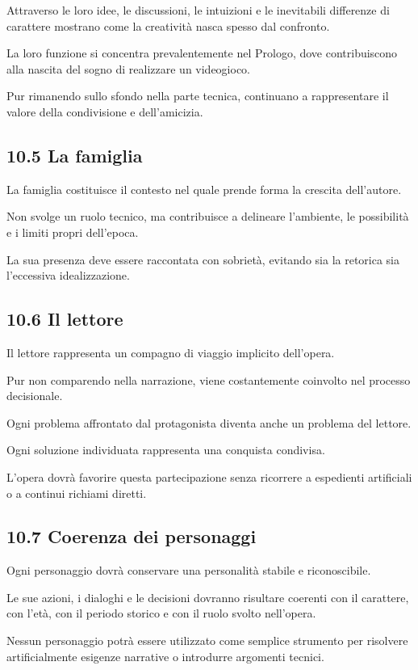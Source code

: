 \documentclass{article}
\begin{document}
Attraverso le loro idee, le discussioni, le intuizioni e le inevitabili differenze di carattere mostrano come la
creatività nasca spesso dal confronto.

La loro funzione si concentra prevalentemente nel Prologo, dove contribuiscono alla nascita del sogno di realizzare un
videogioco.

Pur rimanendo sullo sfondo nella parte tecnica, continuano a rappresentare il valore della condivisione e dell'amicizia.

\subsection{10.5 La famiglia}
La famiglia costituisce il contesto nel quale prende forma la crescita dell'autore.

Non svolge un ruolo tecnico, ma contribuisce a delineare l'ambiente, le possibilità e i limiti propri dell'epoca.

La sua presenza deve essere raccontata con sobrietà, evitando sia la retorica sia l'eccessiva idealizzazione.

\subsection{10.6 Il lettore}
Il lettore rappresenta un compagno di viaggio implicito dell'opera.

Pur non comparendo nella narrazione, viene costantemente coinvolto nel processo decisionale.

Ogni problema affrontato dal protagonista diventa anche un problema del lettore.

Ogni soluzione individuata rappresenta una conquista condivisa.

L'opera dovrà favorire questa partecipazione senza ricorrere a espedienti artificiali o a continui richiami diretti.

\subsection{10.7 Coerenza dei personaggi}
Ogni personaggio dovrà conservare una personalità stabile e riconoscibile.

Le sue azioni, i dialoghi e le decisioni dovranno risultare coerenti con il carattere, con l'età, con il periodo storico
e con il ruolo svolto nell'opera.

Nessun personaggio potrà essere utilizzato come semplice strumento per risolvere artificialmente esigenze narrative o
introdurre argomenti tecnici.
\end{document}
